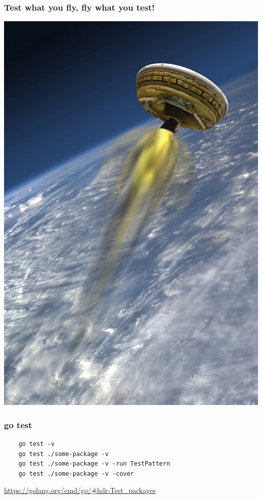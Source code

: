\documentclass[aspectratio=169]{beamer}
\begin{document}
\begin{frame}
  \frametitle{Test what you fly, fly what you test!}

  \includegraphics[scale=.35]{images/PIA18017_hires.jpg}

\end{frame}

\begin{frame}[fragile]
  \frametitle{go test}

  \begin{verbatim}
    go test -v
    go test ./some-package -v
    go test ./some-package -v -run TestPattern
    go test ./some-package -v -cover
  \end{verbatim}

  \url{https://golang.org/cmd/go/\#hdr-Test\_packages}

\end{frame}
\end{document}
